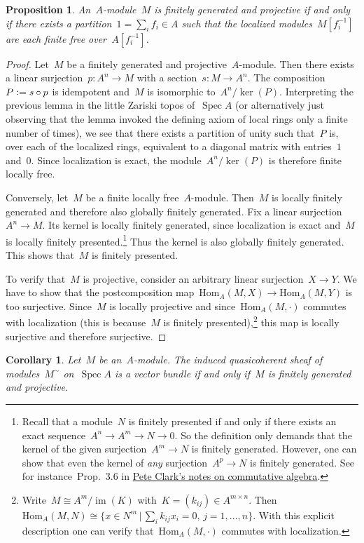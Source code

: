 \documentclass[12pt]{scrartcl}
\theoremstyle{definition}
\theoremstyle{plain}
\newtheorem*{prop}{Proposition}
\newtheorem*{cor}{Corollary}
\theoremstyle{remark}
\newcommand{\defeq}{\vcentcolon=}
\newcommand{\Hom}{\mathrm{Hom}}
\begin{document}
\begin{prop}An~$A$-module~$M$ is finitely generated and projective if and only
if there exists a partition~$1 = \sum_i f_i \in A$ such that the localized
modules~$M[f_i^{-1}]$ are each finite free over~$A[f_i^{-1}]$.\end{prop}

\begin{proof}Let~$M$ be a finitely generated and projective~$A$-module. Then
there exists a linear surjection~$p : A^n \to M$ with a section~$s : M \to
A^n$. The composition~$P \defeq s \circ p$ is idempotent and~$M$ is isomorphic
to~$A^n/\operatorname{ker}(P)$. Interpreting the previous lemma in the little
Zariski topos of~$\operatorname{Spec} A$ (or alternatively just observing that
the lemma invoked the defining axiom of local rings only a finite number of
times), we see that there exists a partition
of unity such that~$P$ is, over each of the localized rings, equivalent to a
diagonal matrix with entries~$1$ and~$0$. Since localization is exact, the
module~$A^n/\operatorname{ker}(P)$ is therefore finite locally free.

Conversely, let~$M$ be a finite locally free~$A$-module. Then~$M$ is locally
finitely generated and therefore also globally finitely generated. Fix a linear
surjection~$A^n \to M$. Its kernel is locally finitely generated, since localization is
exact and~$M$ is locally finitely presented.\footnote{Recall that a module~$N$ is finitely
presented if and only if there exists an exact sequence~$A^n \to A^m \to N \to
0$. So the definition only demands that the kernel of the given surjection~$A^m \to
N$ is finitely generated. However, one can show that even the kernel of \emph{any}
surjection~$A^p \to N$ is finitely generated. See for instance~Prop.~3.6 in
\href{http://math.uga.edu/~pete/integral.pdf}{Pete Clark's notes on commutative
algebra}.}
Thus the kernel is also globally
finitely generated. This shows that~$M$ is finitely presented.

To verify that~$M$ is projective, consider an arbitrary linear surjection~$X
\to Y$. We have to show that the postcomposition map~$\Hom_A(M,X) \to
\Hom_A(M,Y)$ is too surjective. Since~$M$ is locally projective and
since~$\Hom_A(M,\cdot)$ commutes with localization (this is because~$M$ is finitely
presented),\footnote{Write~$M \cong A^m/\operatorname{im}(K)$ with~$K = (k_{ij})
\in A^{m \times n}$. Then~$\Hom_A(M,N)
\cong \{ x \in N^m \,|\, \sum_i k_{ij} x_i = 0,\, j = 1,\ldots,n \}$. With this
explicit description one can verify that~$\Hom_A(M,\cdot)$ commutes with
localization.} this map is locally surjective and therefore surjective.
\end{proof}

\begin{cor}Let~$M$ be an~$A$-module. The induced quasicoherent sheaf of
modules~$M^\sim$ on~$\operatorname{Spec} A$ is a vector bundle if and only
if~$M$ is finitely generated and projective.\end{cor}
\end{document}
